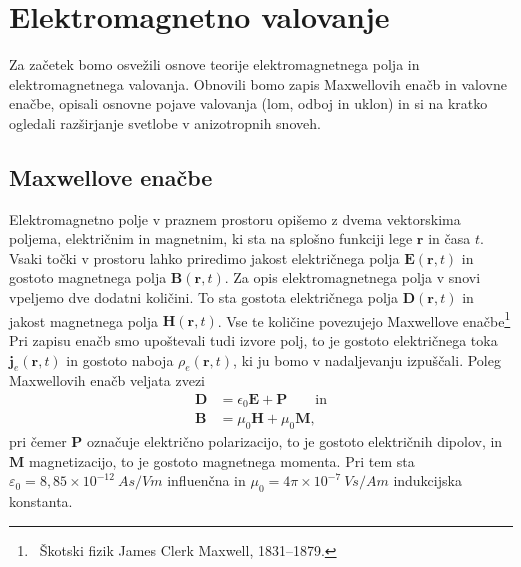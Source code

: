 
\chapter{Elektromagnetno valovanje}
Za začetek bomo osvežili osnove teorije elektromagnetnega polja in 
elektromagnetnega valovanja. Obnovili bomo zapis Maxwellovih enačb in 
valovne enačbe, opisali osnovne pojave valovanja (lom, odboj in uklon)
in si na kratko ogledali razširjanje svetlobe v anizotropnih snoveh. 

\section{Maxwellove enačbe}
Elektromagnetno polje v praznem prostoru opišemo z dvema vektorskima
poljema, električnim in magnetnim, ki sta na splošno funkciji lege $\mathbf{r}$
in časa $t$. Vsaki točki v prostoru lahko priredimo jakost
električnega polja $\mathbf{E}(\mathbf{r},t)$ in gostoto
magnetnega polja $\mathbf{B}(\mathbf{r},t)$. Za opis elektromagnetnega
polja v snovi vpeljemo dve dodatni količini. To sta gostota
električnega polja $\mathbf{D}(\mathbf{r},t)$ in jakost magnetnega
polja $\mathbf{H}(\mathbf{r},t)$.
Vse te količine povezujejo Maxwellove
enačbe\footnote{~Škotski fizik James Clerk Maxwell, 1831--1879.}
\\
Pri zapisu enačb smo upoštevali tudi izvore polj, to je gostoto
električnega toka $\mathbf{j}_e(\mathbf{r},t)$ in gostoto naboja $\rho_{e}(\mathbf{r},t)$, ki 
ju bomo v nadaljevanju izpuščali. Poleg Maxwellovih enačb veljata zvezi
\begin{align}
\mathbf{D} & =\epsilon_{0}\mathbf{E}+\mathbf{P} \qquad \mathrm{in}\\
\mathbf{B} & =\mu_{0}\mathbf{H}+\mu_{0}\mathbf{M},
\end{align}
pri čemer $\mathbf{P}$ označuje električno
polarizacijo, to je gostoto električnih dipolov, in  $\mathbf{M}$
magnetizacijo, to je gostoto magnetnega momenta. 
Pri tem sta $\varepsilon_0 = 8,85 \times 10^{-12}~\si{As/Vm}$ influenčna in  
$\mu_0 = 4 \pi \times 10^{-7}~\si{Vs/Am}$ indukcijska konstanta.

